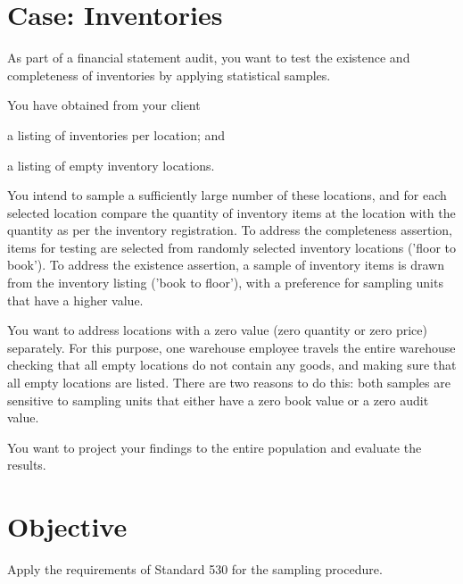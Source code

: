 \begin{mdframed}[hidealllines=true,backgroundcolor=gray!10, innerleftmargin=0.3cm]
\section*{Case: Inventories}
\RaggedRight

As part of a financial statement audit, you want to test the existence and completeness of inventories by applying statistical samples. 

You have obtained from your client 
\begin{compactitem}
	\item a listing of inventories per location; and
	\item a listing of empty inventory locations.
\end{compactitem}

\bigskip
You intend to sample a sufficiently large number of these locations, and for each selected location compare the quantity of inventory items at the location with the quantity as per the inventory registration. To address the completeness assertion, items for testing are selected from randomly selected inventory locations ('floor to book'). To address the existence assertion, a sample of inventory items is drawn from the inventory listing ('book to floor'), with a preference for sampling units that have a higher value.

You want to address locations with a zero value (zero quantity or zero price) separately. For this purpose, one warehouse employee travels the entire warehouse checking that all empty locations do not contain any goods, and making sure that all empty locations are listed. There are two reasons to do this: both samples are sensitive to sampling units that either have a zero book value or a zero audit value. 

You want to project your findings to the entire population and evaluate the results. 


\section*{Objective}
Apply the requirements of Standard 530 for the sampling procedure.
\end{mdframed}

